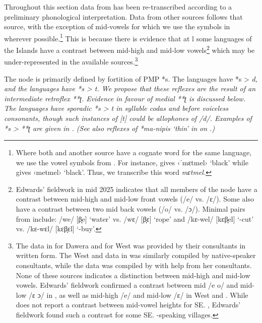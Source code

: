 Throughout this section data from \citet{Taber1993}
has been re-transcribed according to a preliminary
phonological interpretation.
Data from other sources follows that source,
with the exception of mid-vowels
for which we use the symbols in \citet{Taber1993} wherever possible.\footnote{
		Where both \citet{Taber1993} and another source have
		a cognate word for the same language, we use the vowel symbols
		from \citet{Taber1993}. For instance, \citet[418]{Taber1993}
		gives  ‹ˈmɛtmel› `black' while \citet[165]{Chlenova2002}
		gives ‹metmel› `black'. Thus, we transcribe this word \it{mɛtmel}.}
This is because there is evidence that at l some languages
of the  Islands have a contrast between mid-high and mid-low
vowels\footnote{
		Edwards' fieldwork in mid 2025 indicates
		that all members of the  node
		have a contrast between mid-high and mid-low front vowels (/e/ vs. /ɛ/).
		Some also have a contrast between two mid back vowels (/o/ vs. /ɔ/).
		Minimal pairs from  include: /we/ [β̞e] ‘water’ vs.
		/wɛ/ [β̞ɛ] ‘rope’ %
		and /kɛ-wel/ [kɛβ̞el] ‘-cut’
		vs. /kɛ-wɛl/ [kɛβ̞ɛl] ‘-buy’.}
which may be under-represented in the available sources.\footnote{
		The data in \citet{Chlenova2002} for Dawera and
		\citet{ChlenovChlenova2008b} for West 
		was provided by their consultants in written form.
		The West  and  data in \citet{vanDijk2021}
		was similarly compiled by native-speaker consultants,
		while the   data was compiled by \citeauthor{vanDijk2021}
		with help from her consultants.
		None of these sources indicates a distinction
		between mid-high and mid-low vowels.
		Edwards' fieldwork confirmed a contrast
		between mid /e o/ and mid-low /ɛ ɔ/ in ,
		as well as mid-high /e/ and mid-low /ɛ/
		in West  and  .
		While \citet{Steinhauer2009} does not report a contrast
		between mid-vowel heights for SE. ,
		Edwards' fieldwork found such a contrast
		for some SE. -speaking villages.}

The  node is primarily defined by fortition of PMP *s.
The  languages have *s > \it{d},
and the  languages have *s > \it{t}.
We propose that these reflexes are the result of an intermediate retroflex **ʈ.
Evidence in favour of medial **ʈ is discussed below.
The  languages have sporadic *s > \it{t}
in syllable codas and before voiceless consonants,
though such instances of [t] could be allophones of /d/.
Examples of *s > **ʈ are given in .
(See also reflexes of *ma-nipis ‘thin’ in  on .)

